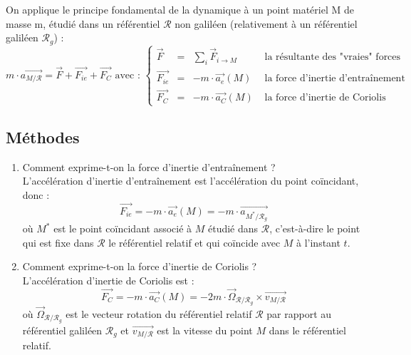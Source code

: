 \documentclass[a4paper,10pt]{book} %
\begin{document}
\bigskip

On applique le principe fondamental de la dynamique à un point matériel M de masse m, étudié dans un référentiel $\mathcal{R}$ non galiléen (relativement à un référentiel galiléen $\mathcal{R}_g$) :
$$m\cdot \overrightarrow{a_{M/\mathcal{R}}}=\overrightarrow{F}+ \overrightarrow{F_{ie}}+\overrightarrow{F_C}
\text{ avec : } 
\left\{\begin{array}{rcll}
\overrightarrow{F}&=&\sum\limits_i \overrightarrow{F}_{i\rightarrow M}&\text{ la résultante des "vraies" forces}\\
\overrightarrow{F_{ie}}&=&-m\cdot \overrightarrow{a_e}(M)&\text{ la force d'inertie d'entraînement}\\
\overrightarrow{F_{C}}&=&-m\cdot \overrightarrow{a_C}(M)&\text{ la force d'inertie de Coriolis}
\end{array}\right.$$

\subsection{Méthodes}
\begin{enumerate}
\item Comment exprime-t-on la force d'inertie d'entraînement ?\\

L'accélération d'inertie d'entraînement est l'accélération du point coïncidant, donc :
$$\overrightarrow{F_{ie}}=-m\cdot\overrightarrow{a_e}(M)=-m\cdot \overrightarrow{a_{M^*/\mathcal{R}_g}}$$
où $M^*$ est le point coïncidant associé à $M$ étudié dans $\mathcal{R}$, c'est-à-dire 
le point qui est fixe dans $\mathcal{R}$ le référentiel relatif  et qui coïncide avec $M$ à l'instant $t$.\\

\item Comment exprime-t-on la force d’inertie de Coriolis ?\\

L'accélération d'inertie de Coriolis est :
$$\overrightarrow{F_C}=-m\cdot \overrightarrow{a_C}(M)=-2m\cdot \overrightarrow{\Omega}_{\mathcal{R}/\mathcal{R}_g}\times \overrightarrow{v_{M/\mathcal{R}}}$$
où $\overrightarrow{\Omega}_{\mathcal{R}/\mathcal{R}_g}$ est le vecteur rotation du référentiel relatif $\mathcal{R}$ par rapport au référentiel galiléen $\mathcal{R}_g$ et $\overrightarrow{v_{M/\mathcal{R}}}$ est la vitesse du point $M$ dans le référentiel relatif.
\end{enumerate}


\end{document}
